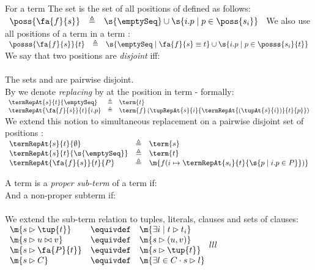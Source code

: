 For a term  The set  is the set of all positions of  defined as follows:\\
$
\begin{array}{lll}
	\poss{\fa{f}{s}} & \triangleq & \s{\emptySeq} \cup \s{i.p \mid p \in \poss{s_i}} \\
\end{array}
$
We also use all positions of a term  in a term :\\
$
\begin{array}{lll}
	\posss{\fa{f}{s}}{t} & \triangleq & \s{\emptySeq \mid \fa{f}{s}\equiv t} \cup \s{i.p \mid p \in \posss{s_i}{t}} \\
\end{array}
$
We say that two positions  are \emph{disjoint} iff:\\
\\
The sets  and  are pairwise disjoint.\\
By  we denote \emph{replacing}  by  at the position  in term  - formally:\\
$
\begin{array}{lll}
	\termRepAt{s        }{t}{\emptySeq} & \triangleq & \term{t} \\
	\termRepAt{\fa{f}{s}}{t}{i.p      } & \triangleq & \term{f}\left(\tupRepAt{s}{i}{\termRepAt{(\tupAt{s}{i})}{t}{p}}\right) \\
\end{array}
$
We extend this notion to simultaneous replacement on a pairwise disjoint set of positions :\\
$
\begin{array}{lll}
	\termRepAt{s        }{t}{\emptyset}     & \triangleq & \term{s} \\
	\termRepAt{s        }{t}{\s{\emptySeq}} & \triangleq & \term{t} \\
	\termRepAt{\fa{f}{s}}{t}{P            } & \triangleq & \m{f(i \mapsto \termRepAt{s_i}{t}{\s{p \mid i.p \in P}})} \\
\end{array}
$

A term  is a \emph{proper sub-term} of a term  if:\\
And a non-proper subterm if:\\
\\
We extend the sub-term relation to tuples, literals, clauses and sets of clauses:\\
$
\begin{array}{lll}
\m{s \rhd \tup{t}}    & \equivdef & \m{\exists i \mid t \rhd t_i}\\
\m{s \rhd u \bowtie v} & \equivdef & \m{s \rhd (u,v)}\\
\m{s \rhd \fa{P}{t}}   & \equivdef & \m{s \rhd \tup{t}}\\
\m{s \rhd C}           & \equivdef & \m{\exists l \in C \cdot s \rhd l}\\
\end{array}{lll}
$


